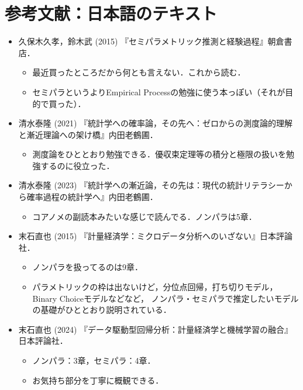 \documentclass[a4paper,10pt]{jarticle}
\begin{document}
\section{参考文献：日本語のテキスト}

\begin{itemize}
  \item 久保木久孝，鈴木武 (2015) 『セミパラメトリック推測と経験過程』朝倉書店．
        \begin{itemize}
          \item 最近買ったところだから何とも言えない．これから読む．
          \item セミパラというよりEmpirical Processの勉強に使う本っぽい（それが目的で買った）．
        \end{itemize}  
  
  \item 清水泰隆 (2021) 『統計学への確率論，その先へ：ゼロからの測度論的理解と漸近理論への架け橋』内田老鶴圃．
        \begin{itemize}
          \item 測度論をひととおり勉強できる．優収束定理等の積分と極限の扱いを勉強するのに役立った．
        \end{itemize} 
    
  \item 清水泰隆 (2023) 『統計学への漸近論，その先は：現代の統計リテラシーから確率過程の統計学へ』内田老鶴圃．
        \begin{itemize}
          \item コアノメの副読本みたいな感じで読んでる．ノンパラは5章．
        \end{itemize}

  \item 末石直也 (2015) 『計量経済学：ミクロデータ分析へのいざない』日本評論社．
        \begin{itemize}
          \item ノンパラを扱ってるのは9章．
          \item パラメトリックの枠は出ないけど，分位点回帰，打ち切りモデル，Binary Choiceモデルなどなど，
                ノンパラ・セミパラで推定したいモデルの基礎がひととおり説明されている．
        \end{itemize}
  
  \item 末石直也 (2024) 『データ駆動型回帰分析：計量経済学と機械学習の融合』日本評論社．
        \begin{itemize}
          \item ノンパラ：3章，セミパラ：4章．
          \item お気持ち部分を丁寧に概観できる．
        \end{itemize}


\end{itemize}
\end{document}
